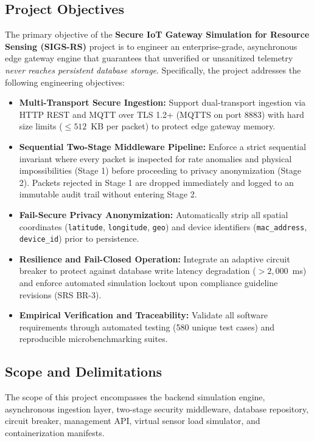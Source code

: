 \subsection{Project Objectives}
The primary objective of the \textbf{Secure IoT Gateway Simulation for Resource Sensing (SIGS-RS)} project is to engineer an enterprise-grade, asynchronous edge gateway engine that guarantees that unverified or unsanitized telemetry \emph{never reaches persistent database storage}. Specifically, the project addresses the following engineering objectives:
\begin{itemize}
    \item \textbf{Multi-Transport Secure Ingestion:} Support dual-transport ingestion via HTTP REST and MQTT over TLS 1.2+ (MQTTS on port 8883) with hard size limits ($\le 512$~KB per packet) to protect edge gateway memory.
    \item \textbf{Sequential Two-Stage Middleware Pipeline:} Enforce a strict sequential invariant where every packet is inspected for rate anomalies and physical impossibilities (Stage 1) before proceeding to privacy anonymization (Stage 2). Packets rejected in Stage 1 are dropped immediately and logged to an immutable audit trail without entering Stage 2.
    \item \textbf{Fail-Secure Privacy Anonymization:} Automatically strip all spatial coordinates (\texttt{latitude}, \texttt{longitude}, \texttt{geo}) and device identifiers (\texttt{mac\_address}, \texttt{device\_id}) prior to persistence.
    \item \textbf{Resilience and Fail-Closed Operation:} Integrate an adaptive circuit breaker to protect against database write latency degradation ($> 2,000$~ms) and enforce automated simulation lockout upon compliance guideline revisions (SRS BR-3).
    \item \textbf{Empirical Verification and Traceability:} Validate all software requirements through automated testing (580 unique test cases) and reproducible microbenchmarking suites.
\end{itemize}

\subsection{Scope and Delimitations}
The scope of this project encompasses the backend simulation engine, asynchronous ingestion layer, two-stage security middleware, database repository, circuit breaker, management API, virtual sensor load simulator, and containerization manifests. 

